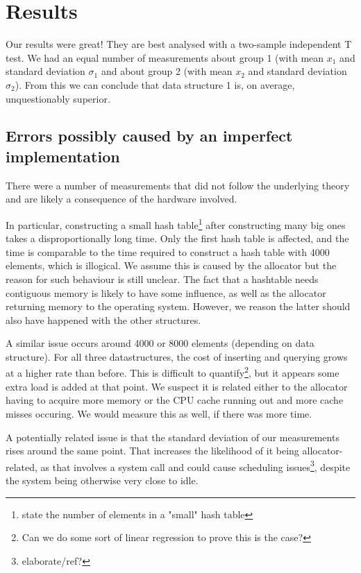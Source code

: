 \documentclass[12pt,a4paper]{article}
\begin{document}
    \section{Results}

    Our results were great!  They are best analysed with a two-sample independent T test.  We had an
    equal number of measurements about group 1 (with mean $x_1$ and standard deviation $\sigma_1$ and
    about group 2 (with mean $x_2$ and standard deviation $\sigma_2$).  From this we can conclude that
    data structure 1 is, on average, unquestionably superior.

    \subsection{Errors possibly caused by an imperfect implementation}

    There were a number of measurements that did not follow the underlying theory and are likely a
    consequence of the hardware involved.

    In particular, constructing a small hash table\footnote{state the number of elements in a "small" hash table}
    after constructing many big ones takes a disproportionally long time.  Only the first hash table is affected, and the time is 			comparable to the time required to construct a hash table with 4000 elements, which is illogical.
    We assume this is caused by the allocator but the reason for such behaviour is still unclear.  The fact
    that a hashtable needs contiguous memory is likely to have some influence, as well as the
    allocator returning memory to the operating system.  However, we reason the latter should also have happened
    with the other structures.

    A similar issue occurs around 4000 or 8000 elements (depending on data structure).  For all three
    datastructures, the cost of inserting and querying grows at a higher rate than before.  This is difficult to
    quantify\footnote{Can we do some sort of linear regression to prove this is the case?}, but it
    appears some extra load is added at that point.  We suspect it is related either to the
    allocator having to acquire more memory or the CPU cache running out and more cache misses occuring.
    We would measure this as well, if there was more time.

    A potentially related issue is that the standard deviation of our measurements rises around the
    same point.  That increases the likelihood of it being allocator-related, as that involves a
    system call and could cause scheduling issues\footnote{elaborate/ref?}, despite the system being 
    otherwise very close to idle.
\end{document}
